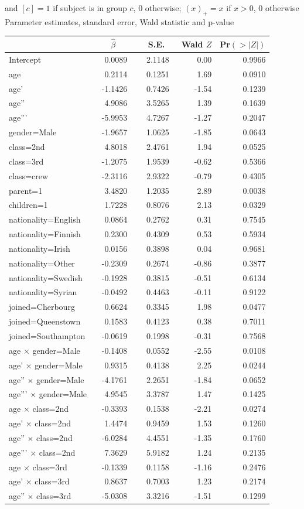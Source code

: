 \documentclass[]{interact}
\theoremstyle{plain}%
\theoremstyle{definition}
\theoremstyle{remark}
\begin{document}
and \([c]=1\) if subject is in group \(c\), 0 otherwise; \((x)_{+}=x\) if \(x > 0\), 0 otherwise\\

Parameter estimates, standard error, Wald statistic and p-value

\small
\setlongtables
\begin{longtable}{lrrrr}
\hline
 \multicolumn{1}{l}{}&\multicolumn{1}{c}{$\hat{\beta}$}&\multicolumn{1}{c}{S.E.}&\multicolumn{1}{c}{Wald $Z$}&\multicolumn{1}{c}{Pr$(>|Z|)$}\tabularnewline
 \hline
 \endhead
 \hline
 \endfoot
 Intercept&~  0.0089~&~ 2.1148~& 0.00&0.9966\tabularnewline
 age&~  0.2114~&~ 0.1251~& 1.69&0.0910\tabularnewline
 age'&~ -1.1426~&~ 0.7426~&-1.54&0.1239\tabularnewline
 age''&~  4.9086~&~ 3.5265~& 1.39&0.1639\tabularnewline
 age'''&~ -5.9953~&~ 4.7267~&-1.27&0.2047\tabularnewline
 gender=Male&~ -1.9657~&~ 1.0625~&-1.85&0.0643\tabularnewline
 class=2nd&~  4.8018~&~ 2.4761~& 1.94&0.0525\tabularnewline
 class=3rd&~ -1.2075~&~ 1.9539~&-0.62&0.5366\tabularnewline
 class=crew&~ -2.3116~&~ 2.9322~&-0.79&0.4305\tabularnewline
 parent=1&~  3.4820~&~ 1.2035~& 2.89&0.0038\tabularnewline
 children=1&~  1.7228~&~ 0.8076~& 2.13&0.0329\tabularnewline
 nationality=English&~  0.0864~&~ 0.2762~& 0.31&0.7545\tabularnewline
 nationality=Finnish&~  0.2300~&~ 0.4309~& 0.53&0.5934\tabularnewline
 nationality=Irish&~  0.0156~&~ 0.3898~& 0.04&0.9681\tabularnewline
 nationality=Other&~ -0.2309~&~ 0.2674~&-0.86&0.3877\tabularnewline
 nationality=Swedish&~ -0.1928~&~ 0.3815~&-0.51&0.6134\tabularnewline
 nationality=Syrian&~ -0.0492~&~ 0.4463~&-0.11&0.9122\tabularnewline
 joined=Cherbourg&~  0.6624~&~ 0.3345~& 1.98&0.0477\tabularnewline
 joined=Queenstown&~  0.1583~&~ 0.4123~& 0.38&0.7011\tabularnewline
 joined=Southampton&~ -0.0619~&~ 0.1998~&-0.31&0.7568\tabularnewline
 age $\times$ gender=Male&~ -0.1408~&~ 0.0552~&-2.55&0.0108\tabularnewline
 age' $\times$ gender=Male&~  0.9315~&~ 0.4138~& 2.25&0.0244\tabularnewline
 age'' $\times$ gender=Male&~ -4.1761~&~ 2.2651~&-1.84&0.0652\tabularnewline
 age''' $\times$ gender=Male&~  4.9545~&~ 3.3787~& 1.47&0.1425\tabularnewline
 age $\times$ class=2nd&~ -0.3393~&~ 0.1538~&-2.21&0.0274\tabularnewline
 age' $\times$ class=2nd&~  1.4474~&~ 0.9459~& 1.53&0.1260\tabularnewline
 age'' $\times$ class=2nd&~ -6.0284~&~ 4.4551~&-1.35&0.1760\tabularnewline
 age''' $\times$ class=2nd&~  7.3629~&~ 5.9182~& 1.24&0.2135\tabularnewline
 age $\times$ class=3rd&~ -0.1339~&~ 0.1158~&-1.16&0.2476\tabularnewline
 age' $\times$ class=3rd&~  0.8637~&~ 0.7003~& 1.23&0.2174\tabularnewline
 age'' $\times$ class=3rd&~ -5.0308~&~ 3.3216~&-1.51&0.1299\tabularnewline

\end{longtable}
\end{document}
